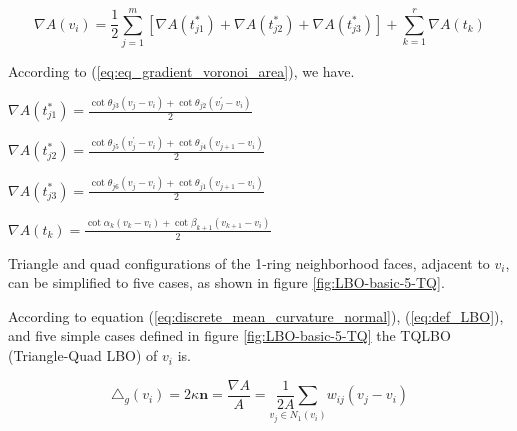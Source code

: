 \documentclass[10pt, conference]{IEEEtran}
\begin{document}
{\small 
\begin{equation}
\nabla A\left(v_{i}\right)=\frac{1}{2}\overset{m}{\underset{j=1}{\sum}}\left[\nabla A\left(t_{j1}^{*}\right)+\nabla A\left(t_{j2}^{*}\right)+\nabla A\left(t_{j3}^{*}\right)\right]+\overset{r}{\underset{k=1}{\sum}}\nabla A\left(t_{k}\right)\label{eq:EqGrad}
\end{equation}
}{\small \par}

According to (\ref{eq:eq_gradient_voronoi_area}), we have.

\begin{center}
$\nabla A\left(t_{j1}^{*}\right)=\frac{\cot\theta_{j3}\left(v_{j}-v_{i}\right)+\cot\theta_{j2}\left(v_{j}^{\prime}-v_{i}\right)}{2}$
\par\end{center}

\begin{center}
$\nabla A\left(t_{j2}^{*}\right)=\frac{\cot\theta_{j5}\left(v_{j}^{\prime}-v_{i}\right)+\cot\theta_{j4}\left(v_{j+1}-v_{i}\right)}{2}$
\par\end{center}

\begin{center}
$\nabla A\left(t_{j3}^{*}\right)=\frac{\cot\theta_{j6}\left(v_{j}-v_{i}\right)+\cot\theta_{j1}\left(v_{j+1}-v_{i}\right)}{2}$
\par\end{center}

\begin{center}
$\nabla A\left(t_{k}\right)=\frac{\cot\alpha_{k}\left(v_{k}-v_{i}\right)+\cot\beta_{k+1}\left(v_{k+1}-v_{i}\right)}{2}$
\par\end{center}

Triangle and quad configurations of the 1-ring neighborhood faces,
adjacent to $v_{i}$, can be simplified to five cases, as shown in
figure \ref{fig:LBO-basic-5-TQ}.

According to equation (\ref{eq:discrete_mean_curvature_normal}),
(\ref{eq:def_LBO}), and five simple cases defined in figure \ref{fig:LBO-basic-5-TQ}
the TQLBO (Triangle-Quad LBO) of $v_{i}$ is.

\begin{equation}
\triangle_{g}\left(v_{i}\right)=2\kappa\mathbf{n}=\frac{\nabla A}{A}=\underset{v_{j}\in N_{1}\left(v_{i}\right)}{\frac{1}{2A}\sum}w_{ij}\left(v_{j}-v_{i}\right)
\end{equation}
\end{document}

